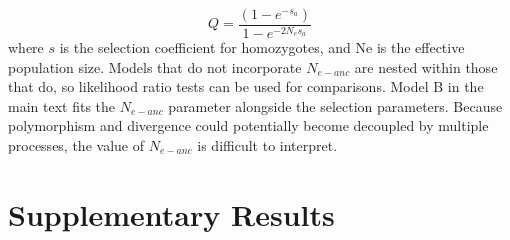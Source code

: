 \begin{equation}
Q = \frac{(1 - e^{-s_a})}{1-e^{-2N_es_a}}
\end{equation}
where $s$ is the selection coefficient for homozygotes, and Ne is the effective population size. Models that do not incorporate $N_{e-anc}$ are nested within those that do, so likelihood ratio tests can be used for comparisons. Model B in the main text fits the $N_{e-anc}$ parameter alongside the selection parameters. Because polymorphism and divergence could potentially become decoupled by multiple processes, the value of $N_{e-anc}$ is difficult to interpret. 

\section{Supplementary Results}
